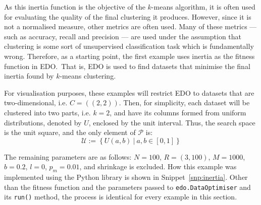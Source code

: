 As this inertia function is the objective of the \(k\)-means algorithm, it is
often used for evaluating the quality of the final clustering it produces.
However, since it is not a normalised measure, other metrics are often used.
Many of these metrics --- such as accuracy, recall and precision --- are used
under the assumption that clustering is some sort of unsupervised classification
task which is fundamentally wrong. Therefore, as a starting point, the first
example uses inertia as the fitness function in EDO.\ That is, EDO is used to
find datasets that minimise the final inertia found by \(k\)-means clustering.

For visualisation purposes, these examples will restrict EDO to datasets that
are two-dimensional, i.e. \(C = ((2, 2))\). Then, for simplicity, each dataset
will be clustered into two parts, i.e. \(k = 2\), and have its columns formed
from uniform distributions, denoted by \(U\), enclosed by the unit interval.
Thus, the search space is the unit square, and the only element of
\(\mathcal{P}\) is:
\begin{equation}
    \mathcal{U} := \left\{U(a, b)~|~a, b \in [0, 1]\right\}
\end{equation}

The remaining parameters are as follows: \(N=100\), \(R=(3,100)\), \(M=1000\),
\(b=0.2\), \(l=0\), \(p_m=0.01\), and shrinkage is excluded. How this example
was implemented using the Python library is shown in Snippet~\ref{snp:inertia}.
Other than the fitness function and the parameters passed to
\texttt{edo.DataOptimiser} and its \texttt{run()}
method, the process is identical for every example in this section.

